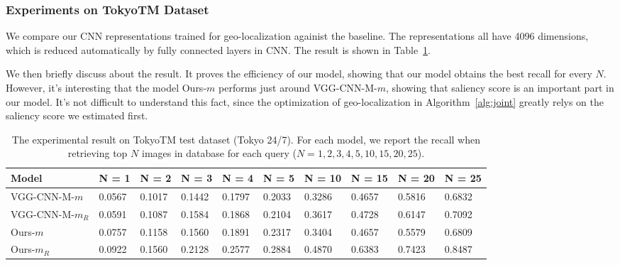 \subsubsection{Experiments on TokyoTM Dataset}
\par
We compare our CNN representations trained for geo-localization againist the baseline. The representations all have 4096 dimensions, which is reduced automatically by fully connected layers in CNN. The result is shown in Table~\ref{table:netvlad-result}. 
\par
We then briefly discuss about the result. It proves the efficiency of our model, showing that our model obtains the best recall for every $N$. However, it's interesting that the model Ours-$m$ performs just around VGG-CNN-M-$m$, showing that saliency score is an important part in our model. It's not difficult to understand this fact, since the optimization of geo-localization in Algorithm~\ref{alg:joint} greatly relys on the saliency score we estimated first. 

\begin{table}[htbp]
\begin{tabular}{l|l|l|l|l|l|l|l|l|l}
\textbf{Model} & \textbf{N = 1} & \textbf{N = 2}& \textbf{N = 3}& \textbf{N = 4}& \textbf{N = 5}& \textbf{N = 10}& \textbf{N = 15} & \textbf{N = 20} & \textbf{N = 25} \\
\hline
VGG-CNN-M-$m$ & 0.0567&0.1017& 0.1442& 0.1797& 0.2033& 0.3286& 0.4657& 0.5816& 0.6832 \\

VGG-CNN-M-$m_R$ & 0.0591& 0.1087& 0.1584& 0.1868& 0.2104& 0.3617& 0.4728& 0.6147& 0.7092 \\

Ours-$m$ & 0.0757& 0.1158& 0.1560& 0.1891& 0.2317& 0.3404& 0.4657& 0.5579& 0.6809 \\

Ours-$m_R$ & 0.0922 & 0.1560 & 0.2128 & 0.2577& 0.2884&0.4870&0.6383&0.7423&0.8487 

\end{tabular}
\caption{The experimental result on TokyoTM test dataset (Tokyo 24/7). For each model, we report the recall when retrieving top $N$ images in database for each query ($N = 1, 2, 3, 4, 5, 10, 15, 20, 25$).}


\label{table:netvlad-result}
\end{table}

